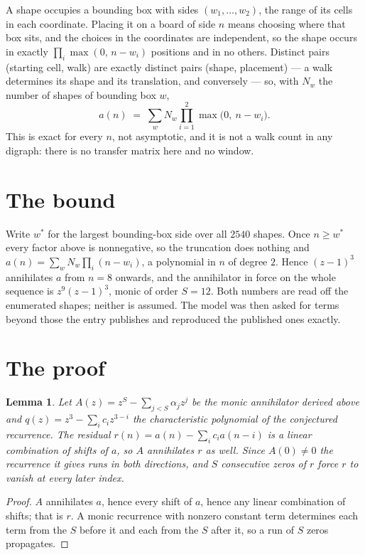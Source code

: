 \documentclass[11pt,a4paper]{article}
\theoremstyle{plain}
\newtheorem{lemma}[theorem]{Lemma}
\theoremstyle{definition}
\begin{document}
A shape occupies a bounding box with sides $(w_1,\dots,w_{2})$, the range of its cells in each
coordinate. Placing it on a board of side $n$ means choosing where that box sits, and the
choices in the coordinates are independent, so the shape occurs in exactly
$\prod_{i}\max(0,\,n-w_i)$ positions and in no others. Distinct pairs (starting cell,
walk) are exactly distinct pairs (shape, placement) --- a walk determines its shape and its
translation, and conversely --- so, with $N_w$ the number of shapes of bounding box $w$,
\[
a(n)\;=\;\sum_{w} N_w \prod_{i=1}^{2}\max\bigl(0,\ n-w_i\bigr).
\]
This is exact for every $n$, not asymptotic, and it is not a walk count in any digraph: there is
no transfer matrix here and no window.

\section{The bound}

Write $w^\ast$ for the largest bounding-box side over all $2540$ shapes. Once $n\ge w^\ast$
every factor above is nonnegative, so the truncation does nothing and
$a(n)=\sum_w N_w\prod_i(n-w_i)$, a polynomial in $n$ of degree $2$. Hence $(z-1)^{3}$
annihilates $a$ from $n=8$ onwards, and the annihilator in force on the whole sequence is
$z^{9}(z-1)^{3}$, monic of order $S=12$. Both numbers are read off the enumerated
shapes; neither is assumed. The model was then asked for terms beyond those the entry publishes
and reproduced the published ones exactly.

\section{The proof}

\begin{lemma}\label{lem:crit}
Let $A(z)=z^S-\sum_{j<S}\alpha_jz^{j}$ be the monic annihilator derived above and
$q(z)=z^{3}-\sum_ic_iz^{3-i}$ the characteristic polynomial of the conjectured
recurrence. The residual $r(n)=a(n)-\sum_ic_ia(n-i)$ is a linear combination of shifts of $a$,
so $A$ annihilates $r$ as well. Since $A(0)\ne0$ the recurrence it gives runs in both
directions, and $S$ consecutive zeros of $r$ force $r$ to vanish at every later index.
\end{lemma}

\begin{proof}
$A$ annihilates $a$, hence every shift of $a$, hence any linear combination of shifts; that is
$r$. A monic recurrence with nonzero constant term determines each term from the $S$ before it
and each from the $S$ after it, so a run of $S$ zeros propagates.
\end{proof}
\end{document}
